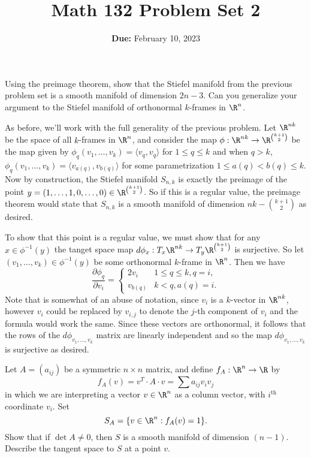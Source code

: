 \documentclass[11pt,letterpaper]{article}
\title{\textbf{Math 132 Problem Set 2}}
\date{\textbf{Due:} February 10, 2023}
\begin{document}
\maketitle

\begin{problem}
    Using the preimage theorem, show that the Stiefel manifold from the previous problem set is a smooth manifold of dimension $2n-3$. Can you generalize your argument to the Stiefel manifold of orthonormal $k$-frames in $\R^n$.
\end{problem}

\begin{solution}
    \quad As before, we'll work with the full generality of the previous problem. Let $\R^{nk}$ be the space of all $k$-frames in $\R^n$, and consider the map $\phi : \R^{nk} \to \R^{\binom{k+1}{2}}$ be the map given by $\phi_q(v_1, \ldots, v_k) = \big\langle v_q, v_q \big\rangle$ for $1\leq q\leq k$ and when $q> k$, $\phi_q(v_1,\ldots,v_k) = \big\langle v_{a(q)}, v_{b(q)} \big\rangle$ for some parametrization $1\leq a(q)<b(q)\leq k$. Now by construction, the Stiefel manifold $S_{n,k}$ is exactly the preimage of the point $y=(1,\ldots,1,0,\ldots,0)\in \R^{\binom{k+1}{2}}$. So if this is a regular value, the preimage theorem would state that $S_{n,k}$ is a smooth manifold of dimension $nk - \binom{k+1}{2}$ as desired.

    \quad To show that this point is a regular value, we must show that for any $x\in \phi^{-1}(y)$ the tanget space map $d\phi_x : T_x\R^{nk} \to T_y\R^{\binom{k+1}{2}}$ is surjective. So let $(v_1,\ldots,v_k)\in \phi^{-1}(y)$ be some orthonormal $k$-frame in $\R^n$. Then we have 
    \[
        \frac{\partial \phi_q}{\partial v_i} = \begin{cases}
            2v_i & 1\leq q\leq k, q=i,\\
            v_{b(q)} & k<q, a(q)=i.
        \end{cases}
    \]  
    Note that is somewhat of an abuse of notation, since $v_i$ is a $k$-vector in $\R^{nk}$, however $v_i$ could be replaced by $v_{i,j}$ to denote the $j$-th component of $v_i$ and the formula would work the same. Since these vectors are orthonormal, it follows that the rows of the $d\phi_{v_1,\ldots,v_k}$ matrix are linearly independent and so the map $d\phi_{v_1,\ldots,v_k}$ is surjective as desired.
\end{solution}

\begin{problem}
    Let $A=(a_{ij})$ be a symmetric $n\times n$ matrix, and define $f_A : \R^n \to \R$ by \[f_A(v) = v^T \cdot A \cdot v = \sum a_{ij}v_iv_j\] in which we are interpreting a vector $v\in \R^n$ as a column vector, with $i^\textrm{th}$ coordinate $v_i$. Set
    \[
        S_A = \{v\in \R^n : f_A(v) = 1\}
    .\] 
    Show that if $\det A\neq 0$, then $S$ is a smooth manifold of dimension $(n-1)$. Describe the tangent space to $S$ at a point $v$. %
\end{problem}
\end{document}
